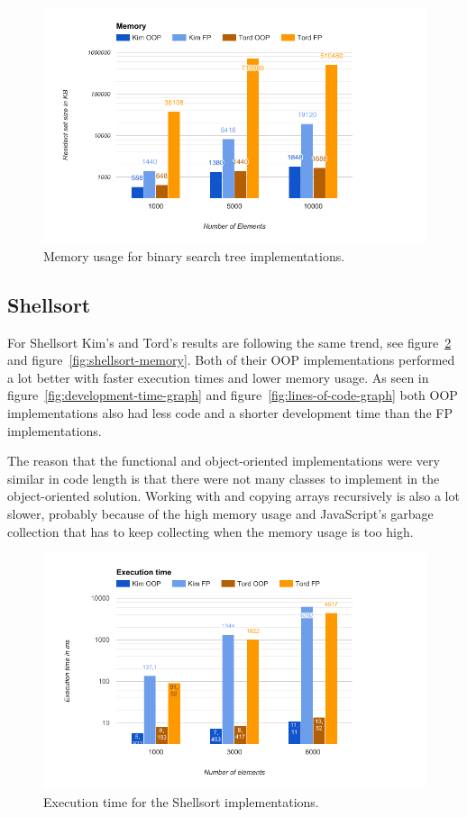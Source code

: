 \documentclass {article}
\begin{document}
\begin{figure}[H]
\centering
\includegraphics[width=\textwidth]{binary-tree-memory}

\caption{Memory usage for binary search tree implementations.}
\label{fig:binary-tree-memory}
\end{figure}
\subsection{Shellsort}
\label{sec:shellsort-results}
For Shellsort Kim's and Tord's results are following the same trend, see figure~\ref{fig:shellsort-runtime} and figure~\ref{fig:shellsort-memory}. Both of their OOP implementations performed a lot better with faster execution times and lower memory usage. As seen in figure~\ref{fig:development-time-graph} and figure~\ref{fig:lines-of-code-graph} both OOP implementations also had less code and a shorter development time than the FP implementations.

The reason that the functional and object-oriented implementations were very similar in code length is that there were not many classes to implement in the object-oriented solution. Working with and copying arrays recursively is also a lot slower, probably because of the high memory usage and JavaScript's garbage collection that has to keep collecting when the memory usage is too high.

\begin{figure}[H]
\centering
\includegraphics[width=\textwidth]{shellsort-runtime}

\caption{Execution time for the Shellsort implementations.}
\label{fig:shellsort-runtime}
\end{figure}
\end{document}

